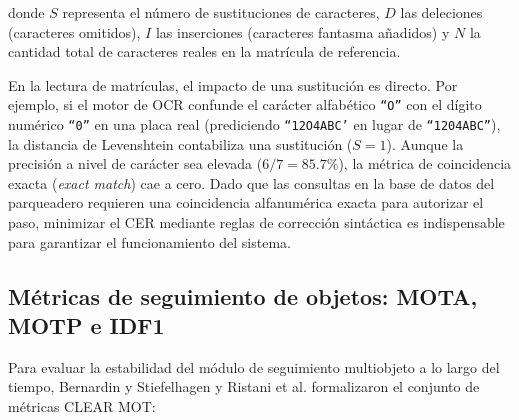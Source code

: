 donde $S$ representa el número de sustituciones de caracteres, $D$ las deleciones
(caracteres omitidos), $I$ las inserciones (caracteres fantasma añadidos) y $N$
la cantidad total de caracteres reales en la matrícula de referencia. 

En la lectura de matrículas, el impacto de una sustitución es directo. Por
ejemplo, si el motor de OCR confunde el carácter alfabético \texttt{``O''} con el
dígito numérico \texttt{``0''} en una placa real (prediciendo \texttt{``12O4ABC'}
en lugar de \texttt{``1204ABC''}), la distancia de Levenshtein contabiliza una
sustitución ($S = 1$). Aunque la precisión a nivel de carácter sea elevada
($6/7 = 85{.}7\%$), la métrica de coincidencia exacta (\textit{exact match})
cae a cero. Dado que las consultas en la base de datos del parqueadero requieren
una coincidencia alfanumérica exacta para autorizar el paso, minimizar el CER
mediante reglas de corrección sintáctica es indispensable para garantizar el
funcionamiento del sistema.

\subsection{Métricas de seguimiento de objetos: MOTA, MOTP e IDF1}

Para evaluar la estabilidad del módulo de seguimiento multiobjeto a lo largo del
tiempo, Bernardin y Stiefelhagen \cite{bernardin2008clear} y Ristani et al.
\cite{ristani2016performance} formalizaron el conjunto de métricas CLEAR MOT:


